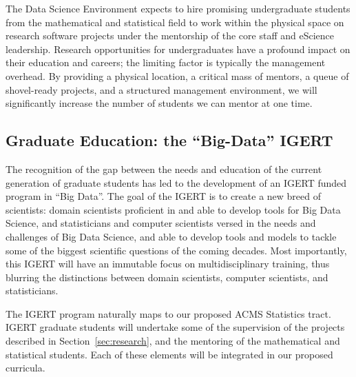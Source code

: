 The Data Science Environment expects to hire promising undergraduate students from the mathematical and statistical field to work within the physical space on research software projects under the mentorship of the core staff and eScience leadership.  Research opportunities for undergraduates have a profound impact on their education and careers; the limiting factor is typically the management overhead.  By providing a physical location, a critical mass of mentors, a queue of shovel-ready projects, and a structured management environment, we will significantly increase the number of students we can mentor at one time.

\subsection{Graduate Education: the ``Big-Data'' IGERT}
\vspace{-0.8em}

The recognition of the gap between the needs and education of the current generation of graduate students has led to the development of an IGERT funded program in ``Big Data''.  The goal of the IGERT is to create a new breed of scientists: domain scientists proficient in and able to develop tools for Big Data Science, and statisticians and computer scientists versed in the needs and challenges of Big Data Science, and able to develop tools and models to tackle some of the biggest scientific questions of the coming decades.  Most importantly, this IGERT will have an immutable focus on multidisciplinary training, thus blurring the distinctions between domain scientists, computer scientists, and statisticians.

The IGERT program naturally maps to our proposed ACMS Statistics tract. IGERT graduate students will undertake some of the supervision of the projects described in Section~\ref{sec:research}, and the mentoring of the mathematical and statistical students. Each of these elements will be integrated in our proposed curricula. 
